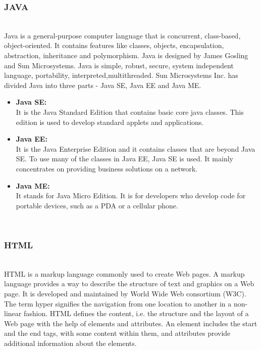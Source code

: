 \documentclass[12pt,a4paper]{article}
\begin{document}
\subsubsection{JAVA}
\\
\hspace{0.7 cm} Java is a general-purpose computer language
 that is concurrent, class-based, object-oriented. It contains features like classes, objects, encapsulation, abstraction, inheritance and polymorphism. Java is designed by  James Gosling and Sun Microsystems. Java is simple, robust, secure, system independent language, portability, interpreted,multithreaded. Sun Microsystems Inc. has divided Java into three parts - Java SE, Java EE and Java ME.
\\
\begin{itemize}
\item \textbf{Java SE:}
\\
\hspace{0.7 cm} It is the Java Standard Edition that contains basic core java classes. This edition is used to develop standard applets and applications.
\\
\item \textbf{Java EE:}
\\
\hspace{0.7 cm} It is the Java Enterprise Edition and it contains classes that are beyond Java SE. To use many of the classes in Java EE, Java SE is used. It mainly concentrates on providing business solutions on a network.
\\
\item \textbf{Java ME:}
\\
\hspace{0.7 cm} It stands for Java Micro Edition. It is for developers who develop code for portable devices, such as a
 PDA or a cellular phone.
\end{itemize}
\\

\newpage
\subsubsection{HTML}
\\
\hspace{0.7 cm} HTML is a markup language commonly used to create Web pages. A markup language provides a way to describe the structure of text and graphics on a Web page. It is developed and maintained by World Wide Web consortium (W3C). The term hyper signifies the navigation from one location to another in a non-linear fashion. HTML defines the content, i.e. the structure and the layout of a Web page with the help of elements and attributes. An element includes the start and the end tags, with some content within them, and attributes provide additional information about the elements.
\\
\end{document}
